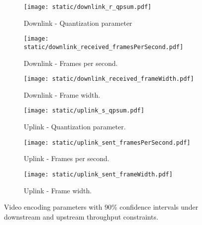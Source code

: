 \begin{figure*}[t]
    \begin{subfigure}[t]{0.33\textwidth}
    		\centering
        \texttt{[image: static/downlink\_r\_qpsum.pdf]}
        \caption{Downlink - Quantization parameter}
 		\label{subfig:downlink_video_qp}
    \end{subfigure}%
    \hfill
	\begin{subfigure}[t]{0.33\textwidth}
        \centering
        \texttt{[image: static/downlink\_received\_framesPerSecond.pdf]}
    \caption{Downlink - Frames per second.}
    \label{subfig:downlink_frames_per_second}
    \end{subfigure}%
    \hfill
	\begin{subfigure}[t]{0.33\textwidth}
        \centering
        \texttt{[image: static/downlink\_received\_frameWidth.pdf]}
    \caption{Downlink - Frame width.}
    \label{subfig:downlink_frame_width}
    \end{subfigure}
    \newline
        \begin{subfigure}[t]{0.33\textwidth}
    		\centering
        \texttt{[image: static/uplink\_s\_qpsum.pdf]}
        \caption{Uplink - Quantization parameter.}
 		\label{subfig:uplink_video_qp}
    \end{subfigure}%
    \hfill
	\begin{subfigure}[t]{0.33\textwidth}
        \centering
        \texttt{[image: static/uplink\_sent\_framesPerSecond.pdf]}
    \caption{Uplink - Frames per second.}
    \label{subfig:uplink_frames_per_second}
    \end{subfigure}%
    \hfill
	\begin{subfigure}[t]{0.33\textwidth}   
        \centering
        \texttt{[image: static/uplink\_sent\_frameWidth.pdf]}
    \caption{Uplink - Frame width.}
    \label{subfig:uplink_frame_width}
    \end{subfigure}
	\caption{Video encoding parameters with 90\% confidence intervals under
    downstream and upstream throughput constraints.}
	\label{fig:video_qual}
\end{figure*}

